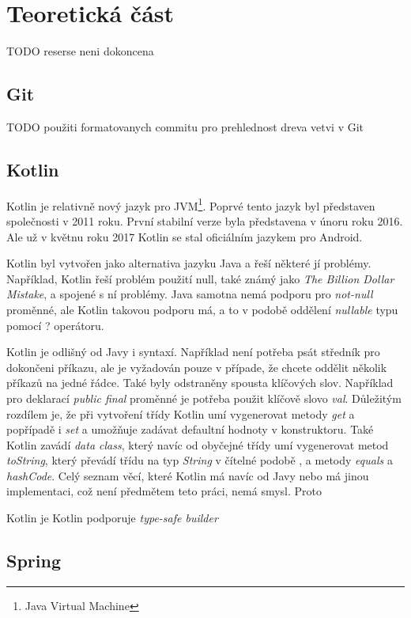 \chapter{Teoretická část}\label{resere}
TODO reserse neni dokoncena
\section{Git}\label{reserse:git}
    TODO použiti formatovanych commitu pro prehlednost dreva vetvi v Git
\section{Kotlin}\label{resere:kotlin}
    Kotlin je relativně nový jazyk pro JVM\footnote{Java Virtual Machine}. Poprvé tento jazyk byl představen společnosti v 2011 roku. První stabilní verze byla představena v únoru roku 2016. Ale už v květnu roku 2017 Kotlin se stal oficiálním jazykem pro Android.
    
    Kotlin byl vytvořen jako alternativa jazyku Java a řeší některé jí problémy. Například, Kotlin řeší problém použití null, také známý jako \textit{The Billion Dollar Mistake}\cite{theBDM}, a spojené s ní problémy. Java samotna nemá podporu pro \textit{not-null} proměnné, ale Kotlin takovou podporu má, a to v podobě oddělení \textit{nullable} typu pomocí ? operátoru.
    
    Kotlin je odlišný od Javy i syntaxí. Například není potřeba psát středník pro dokončeni příkazu, ale je vyžadován pouze v případe, že chcete oddělit několik příkazů na jedné řádce. Také byly odstraněny spousta klíčových slov. Například pro deklarací \textit{public final} proměnné je potřeba použit klíčově slovo \textit{val}. Důležitým rozdílem je, že při vytvoření třídy Kotlin umí vygenerovat metody \textit{get} a popřípadě i \textit{set} a umožňuje zadávat defaultní hodnoty v konstruktoru. Také Kotlin zavádí \textit{data class}, který navíc od obyčejné třídy umí vygenerovat metod \textit{toString}, který převádí třídu na typ \textit{String} v čítelné podobě \cite{Priklad vygenerovane tridy}, a metody \textit{equals} a \textit{hashCode}. Celý seznam věcí, které Kotlin má navíc od Javy nebo má jinou implementaci, což není předmětem teto práci, nemá smysl. Proto 
    
    
    Kotlin je Kotlin podporuje \textit{type-safe builder}
\section{Spring}\label{resere:j2ee}
    
